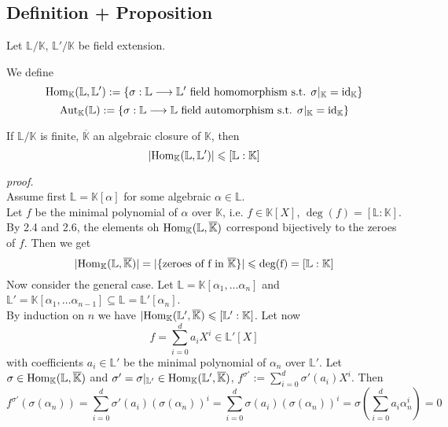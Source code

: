 \documentclass[12pt]{book}
\begin{document}
\begin{spacing}{1.3}
\subsection{Definition + Proposition} %
Let $\mathbb{L}/\mathbb{K}$, $\mathbb{L}'/\mathbb{K}$ be field extension.
\begin{compactenum}
\item We define $$\rm{Hom}_{\mathbb{K}}(\mathbb{L},\mathbb{L}'):=\left\{\sigma: \mathbb{L}\longrightarrow \mathbb{L}' \textrm{ field homomorphism s.t. } \sigma |_{\mathbb{K}}=\rm{id}_{\mathbb{K}}\right\}$$
$$\rm{Aut}_{\mathbb{K}}(\mathbb{L}):=\left\{\sigma: \mathbb{L} \longrightarrow \mathbb{L} \textrm{ field automorphism s.t. } \sigma |_{\mathbb{K}}=\rm{id}_{\mathbb{K}} \right\}$$
\item If $\mathbb{L}/\mathbb{K}$ is finite, $\overline{\mathbb{K}}$ an algebraic closure of $\mathbb{K}$, then 
$$ \vert \rm{Hom}_{\mathbb{K}}(\mathbb{L},\mathbb{L}') \vert \leqslant [\mathbb{L}:\mathbb{K}]$$
\end{compactenum}
\textit{proof.}\\
Assume first $\mathbb{L}=\mathbb{K}[\alpha]$ for some algebraic $\alpha \in \mathbb{L}$.\\
Let $f$ be the minimal polynomial of $\alpha$ over $\mathbb{K}$, i.e. $f \in \mathbb{K}[X]$, $\deg(f)=[\mathbb{L}:\mathbb{K}]$.\\
By 2.4 and 2.6, the elements oh $\rm{Hom}_{\mathbb{K}}(\mathbb{L}, \overline{\mathbb{K}})$ correspond bijectively to the zeroes of $f$. Then we get
$$ \vert \rm{Hom}_{\mathbb{K}}(\mathbb{L}, \overline{\mathbb{K}}) \vert = \vert \{\textrm{zeroes of f in }\overline{\mathbb{K}} \}\vert \leqslant deg(f) = [\mathbb{L}:\mathbb{K}]$$
Now consider the general case. Let $\mathbb{L}=\mathbb{K}[\alpha_1, \dots \alpha_n]$ and $\mathbb{L}'=\mathbb{K}[\alpha_1, \dots \alpha_{n-1}] \subseteq \mathbb{L}= \mathbb{L}'[\alpha_n]$.\\
By induction on $n$ we have $\vert \rm{Hom}_{\mathbb{K}}(\mathbb{L}', \overline{\mathbb{K}}) \leqslant [\mathbb{L}':\mathbb{K}]$.
Let now $$f=\sum_{i=0}^d a_i X^{i} \in \mathbb{L}'[X]$$ with coefficients $a_i \in \mathbb{L}'$ be the minimal polynomial of $\alpha_n$ over $\mathbb{L}'$.  Let $\sigma \in \rm{Hom}_{\mathbb{K}}(\mathbb{L}, \overline{\mathbb{K}})$ and $\sigma'=\sigma |_{\mathbb{L}'} \in \rm{Hom}_{\mathbb{K}}(\mathbb{L}', \overline{\mathbb{K}})$, $f^{\sigma'}:= \sum_{i=0}^d \sigma'(a_i) X^{i}$. Then
$$f^{\sigma'}\left(\sigma(\alpha_n)\right)=\sum_{i=0}^d \sigma'(a_i) \left(\sigma(\alpha_n)\right)^{i}=\sum_{i=0}^d \sigma(a_i) \left(\sigma(\alpha_n)\right)^{i} = \sigma \left(\sum_{i=0}^d a_i \alpha_n^{i}\right)=0$$

\end{spacing}
\end{document}

